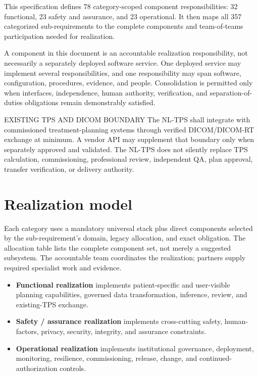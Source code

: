 \documentclass[11pt,letterpaper]{article}
\begin{document}

This specification defines 78 category-scoped component responsibilities: 32 functional, 23 safety and assurance, and 23 operational. It then maps all 357 categorized sub-requirements to the complete components and team-of-teams participation needed for realization.

A component in this document is an accountable realization responsibility, not necessarily a separately deployed software service. One deployed service may implement several responsibilities, and one responsibility may span software, configuration, procedures, evidence, and people. Consolidation is permitted only when interfaces, independence, human authority, verification, and separation-of-duties obligations remain demonstrably satisfied.

\begin{nlnotice}{EXISTING TPS AND DICOM BOUNDARY}
The NL-TPS shall integrate with commissioned treatment-planning systems through verified DICOM/DICOM-RT exchange at minimum. A vendor API may supplement that boundary only when separately approved and validated. The NL-TPS does not silently replace TPS calculation, commissioning, professional review, independent QA, plan approval, transfer verification, or delivery authority.
\end{nlnotice}

\section{Realization model}

Each category uses a mandatory universal stack plus direct components selected by the sub-requirement's domain, legacy allocation, and exact obligation. The allocation table lists the complete component set, not merely a suggested subsystem. The accountable team coordinates the realization; partners supply required specialist work and evidence.

\begin{itemize}
\item \textbf{Functional realization} implements patient-specific and user-visible planning capabilities, governed data transformation, inference, review, and existing-TPS exchange.
\item \textbf{Safety / assurance realization} implements cross-cutting safety, human-factors, privacy, security, integrity, and assurance constraints.
\item \textbf{Operational realization} implements institutional governance, deployment, monitoring, resilience, commissioning, release, change, and continued-authorization controls.
\end{itemize}
\end{document}

